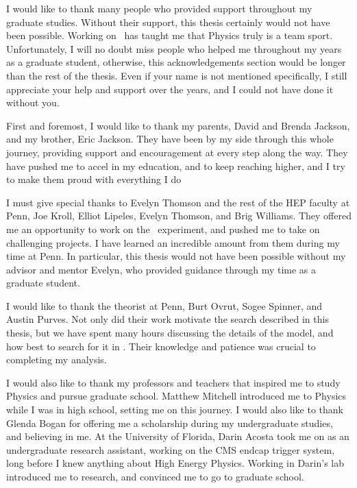 
I would like to thank many people who provided support throughout my graduate
studies.
Without their support, this thesis certainly would not have been possible.
Working on \atlas\ has taught me that Physics truly is a team sport.
Unfortunately, I will no doubt miss people who helped me throughout my years
as a graduate student, otherwise, this acknowledgements section would be longer
than the rest of the thesis.
Even if your name is not mentioned specifically, I still appreciate your
help and support over the years, and I could not have done it without you.

First and foremost, I would like to thank my parents, David and Brenda Jackson,
and my brother, Eric Jackson.
They have been by my side through this whole journey, providing support and
encouragement at every step along the way.
They have pushed me to accel in my education, and to keep reaching higher, and
I try to make them proud with everything I do

I must give special thanks to Evelyn Thomson and the rest of the HEP faculty
at Penn,
Joe Kroll,
Elliot Lipeles,
Evelyn Thomson,
and Brig Williams.
They offered me an opportunity to work on the \atlas\ experiment, and
pushed me to take on challenging projects.
I have learned an incredible amount from them during my time at Penn.
In particular, this thesis would not have been possible without my advisor
and mentor Evelyn, who provided guidance through my time as a graduate student.

I would like to thank the theorist at Penn, 
Burt Ovrut,
Sogee Spinner,
and Austin Purves.
Not only did their work motivate the search described in this thesis, but
we have spent many hours discussing the details of the model, and how best to
search for it in \atlas.
Their knowledge and patience was crucial to completing my analysis.

I would also like to thank my professors and teachers that inspired me to
study Physics and pursue graduate school.
Matthew Mitchell introduced me to Physics while I was in high school, setting
me on this journey.
I would also like to thank Glenda Bogan for offering me a scholarship during my
undergraduate studies, and believing in me.
At the University of Florida, Darin Acosta took me on as an undergraduate
research assistant, working on the CMS endcap trigger system, long before
I knew anything about High Energy Physics.
Working in Darin's lab introduced me to research, and convinced me to go to
graduate school.

